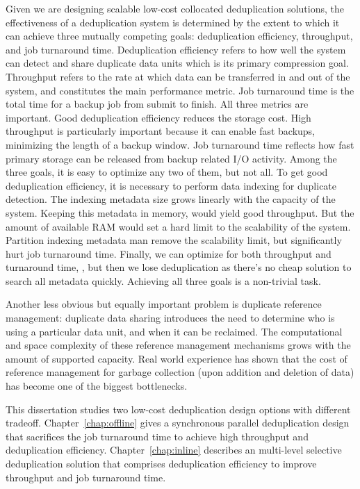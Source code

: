 Given we are designing scalable low-cost collocated deduplication solutions,
the effectiveness of a deduplication system is determined 
by the extent to which it can achieve three mutually competing goals: 
deduplication efficiency, throughput, and job turnaround time. 
Deduplication efficiency refers to
how well the system can detect and share duplicate data
units which is its primary compression goal. Throughput refers
to the rate at which data can be transferred in and out of
the system, and constitutes the main performance metric.
Job turnaround time is the total time for a backup job from submit to finish.
All three metrics are important. Good deduplication efficiency 
reduces the storage cost. High throughput
is particularly important because it can enable fast backups, 
minimizing the length of a backup window. 
Job turnaround time reflects how fast primary storage 
can be released from backup related I/O activity.
Among the three goals, it is easy to optimize any two of them,
but not all. To get good deduplication efficiency, 
it is necessary to perform data indexing for duplicate detection.
The indexing metadata size grows linearly with the capacity of the system. 
Keeping this metadata in memory,
would yield good throughput. 
But the amount of available RAM would set a hard limit to the scalability of the
system. Partition indexing metadata man remove
the scalability limit, but significantly hurt job turnaround time.
Finally, we can optimize for both throughput and turnaround time, 
, but then we lose deduplication as there's no cheap solution to search all metadata quickly. 
Achieving all three goals is a non-trivial task.

Another less obvious but equally important problem is
duplicate reference management: duplicate data sharing
introduces the need to determine who is using a particular data unit, and when it can be reclaimed. 
The computational and space complexity of these reference management mechanisms grows 
with the amount of supported capacity. Real world experience has shown that the
cost of reference management for garbage collection (upon addition and deletion of data) 
has become one of the biggest 
bottlenecks.

This dissertation studies two low-cost deduplication design options with different tradeoff. 
Chapter~\ref{chap:offline} gives a synchronous parallel deduplication design that
sacrifices the job turnaround time to achieve high throughput and deduplication efficiency.
Chapter~\ref{chap:inline} describes an multi-level selective deduplication solution
that comprises deduplication efficiency to improve throughput and job turnaround time.


